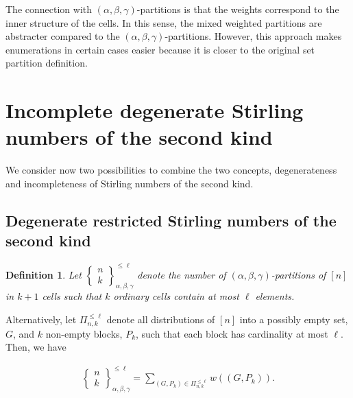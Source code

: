 \documentclass[12pt, reqno]{amsart}
\newtheorem{proof 1}{proof 1}
\newtheorem{definition}{Definition}[section]
\def\sts#1#2{\begin{Bmatrix}
#1 \\ #2 \end{Bmatrix}}
\begin{document}
The connection with $(\alpha, \beta, \gamma)$-partitions is that the weights correspond to the inner structure of the cells. In this sense, the mixed weighted partitions are abstracter compared to the $(\alpha,\beta,\gamma)$-partitions. However, this approach makes enumerations in certain cases easier because it is closer to the original set partition definition. 


\section{Incomplete degenerate Stirling numbers of the second kind}
We consider now two possibilities to combine the two concepts, degenerateness and incompleteness of Stirling numbers of the second kind. 
\subsection{Degenerate restricted Stirling numbers of the second kind}

\begin{definition}\label{definition:3} Let $\sts{n}{k}_{\alpha, \beta, \gamma}^{\leq \ell}$ denote the number of $(\alpha,\beta,\gamma)$-partitions of $[n]$ in $k+1$ cells such that $k$ ordinary cells contain at most $\ell $ elements.  
\end{definition}

Alternatively, let $\Pi^{\leq \ell}_{n,k}$  denote all distributions of $[n]$ into a possibly empty set, $G$,  and $k$ non-empty blocks, $P_k$, such that each block has cardinality at most $\ell$. Then, we have

\begin{align*}
\sts{n}{k}_{\alpha,\beta,\gamma}^{\leq \ell}= \sum_{(G,P_k)\in \Pi^{\leq \ell}_{n,k}} w((G,P_k)).
\end{align*}
\end{document}
